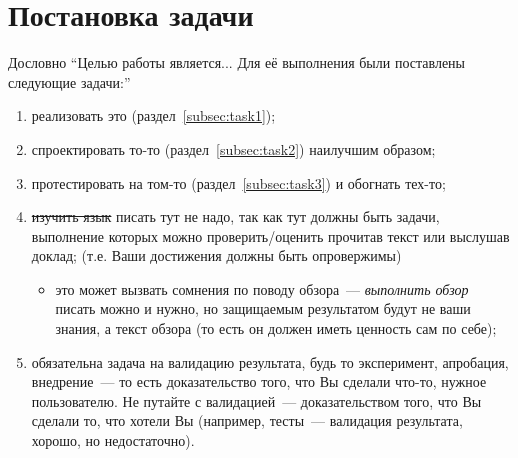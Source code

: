 
\section{Постановка задачи}
\label{sec:task}

Дословно \enquote{Целью работы является... Для её выполнения были постав\-лены следующие задачи:}
\begin{enumerate}
    \item реализовать это (раздел~\ref{subsec:task1});
    \item спроектировать то-то (раздел~\ref{subsec:task2}) наилучшим образом;
    \item протестировать на том-то (раздел~\ref{subsec:task3}) и обогнать тех-то;
    \item \sout{изучить язык \OCaml{}} писать тут не надо, так как тут должны быть задачи, выполнение которых можно проверить/оценить прочитав текст или выслушав доклад;
          (т.е. Ваши достижения должны быть опровержимы)
          \begin{itemize}
              \item это может вызвать сомнения по поводу обзора~--- \emph{выполнить обзор} писать можно и нужно, но защищаемым результатом будут не ваши знания, а текст обзора (то есть он должен иметь ценность сам по себе);
          \end{itemize}
    \item обязательна задача на валидацию результата, будь то эксперимент, апробация, внедрение~--- то есть доказательство того, что Вы сделали что-то, нужное пользователю.
          Не путайте с валидацией~--- доказательством того, что Вы сделали то, что хотели Вы (например, тесты~--- валидация результата, хорошо, но недостаточно).
\end{enumerate}
